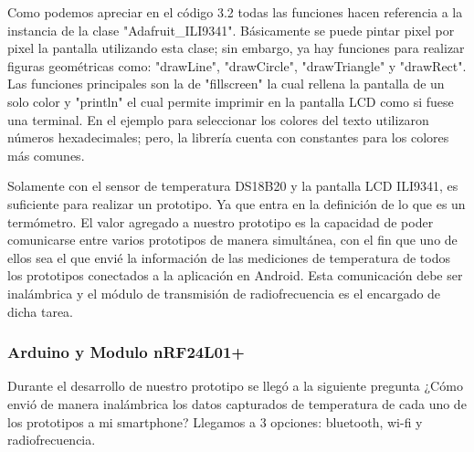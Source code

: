 \par \noindent
Como podemos apreciar en el código 3.2 todas las funciones hacen referencia a la instancia de la clase "Adafruit\_ILI9341". Básicamente se puede pintar pixel por pixel la pantalla utilizando esta clase; sin embargo, ya hay funciones para realizar figuras geométricas como: "drawLine", "drawCircle", "drawTriangle" y "drawRect". Las funciones principales son la de "fillscreen" la cual rellena la pantalla de un solo color y "println" el cual permite imprimir en la pantalla LCD como si fuese una terminal. En el ejemplo para seleccionar los colores del texto utilizaron números hexadecimales; pero, la librería cuenta con constantes para los colores más comunes.

\par \noindent
Solamente con el sensor de temperatura DS18B20 y la pantalla LCD ILI9341, es suficiente para realizar un prototipo. Ya que entra en la definición de lo que es un termómetro. El valor agregado a nuestro prototipo es la capacidad de poder comunicarse entre varios prototipos de manera simultánea, con el fin que uno de ellos sea el que envié la información de las mediciones de temperatura de todos los prototipos conectados a la aplicación en Android. Esta comunicación debe ser inalámbrica y el módulo de transmisión de radiofrecuencia es el encargado de dicha tarea.

\subsubsection{Arduino y Modulo nRF24L01+}
\par 
Durante el desarrollo de nuestro prototipo se llegó a la siguiente pregunta ¿Cómo envió de manera inalámbrica los datos capturados de temperatura de cada uno de los prototipos a mi smartphone? Llegamos a 3 opciones: bluetooth, wi-fi y radiofrecuencia.


